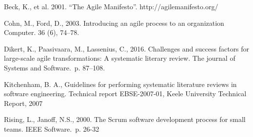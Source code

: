\renewcommand{\baselinestretch}{1.0}
\setlength{\parskip}{0.5em}

Beck, K., et al. 2001. ``The Agile Manifesto''.
http://agilemanifesto.org/

Cohn, M., Ford, D., 2003. Introducing an agile process to an
organization Computer. 36 (6), 74–78.

Dikert, K., Paasivaara, M., Lassenius, C., 2016. Challenges and success factors
for large-scale agile transformations: A systematic literary review. The journal
of Systems and Software.\ p. 87–108.

Kitchenham, B. A., Guidelines for performing systematic literature
reviews in software engineering. Technical report EBSE-2007-01, Keele University
Technical Report, 2007

Rising, L., Janoff, N.S., 2000. The Scrum software development process for small teams. IEEE Software.\ p. 26-32
